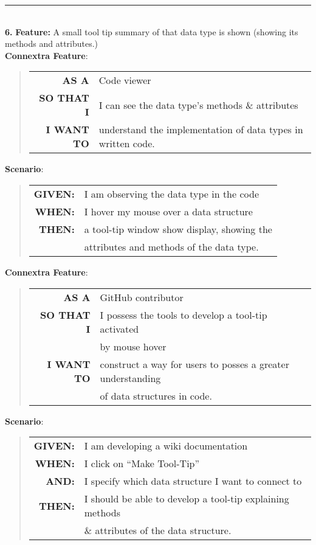 \documentclass[12pt]{article}
\newcommand{\Feature}[1]{ 
   \noindent \textbf{Feature:} #1
}
\newcommand{\GivenSc} {
	\noindent \textbf{GIVEN:}
	}
\newcommand{\WhenSc} {
	\noindent \textbf{WHEN:}
	}
\newcommand{\AndSc} {
	\noindent \textbf{AND:}
	}
\newcommand{\ThenSc} {
	\noindent \textbf{THEN:}
	}
\begin{document}
\begin{framed}
\hrule~\\

\noindent\textbf{6.}\Feature{A small tool tip summary of that data type is shown (showing its methods and attributes.)}\\[0.2cm]

\noindent \textbf{Connextra Feature}:
\begin{quote}
\begin{tabular}{rl}
\textbf{AS A}      & Code viewer\\
\textbf{SO THAT I} & I can see the data type's methods \& attributes \\
\textbf{I WANT TO} & understand the implementation of data types in written code.
\end{tabular}
\end{quote}

\pagebreak
\noindent \textbf{Scenario}:
\begin{quote}
\begin{tabular}{rl}
\GivenSc & I am observing the data type in the code\\
\WhenSc & I hover my mouse over a data structure\\
\ThenSc & a tool-tip window show display, showing the \\ 
        & attributes and methods of the data type.
\end{tabular}
\end{quote}

\noindent \textbf{Connextra Feature}:
\begin{quote}
\begin{tabular}{rl}
\textbf{AS A}      & \textsf{GitHub} contributor\\
\textbf{SO THAT I} & I possess the tools to develop a tool-tip activated \\                    
                   & by mouse hover\\
\textbf{I WANT TO} & construct a way for users to posses a greater understanding \\
                   & of data structures in code.
\end{tabular}
\end{quote}

\noindent \textbf{Scenario}:
\begin{quote}
\begin{tabular}{rl}
\GivenSc & I am developing a wiki documentation\\
\WhenSc & I click on ``Make Tool-Tip''\\
\AndSc &  I specify which data structure I want to connect to\\
\ThenSc & I should be able to develop a tool-tip explaining methods\\
        &  \& attributes of the data structure.
\end{tabular}
\end{quote}
\end{framed}
\end{document}
